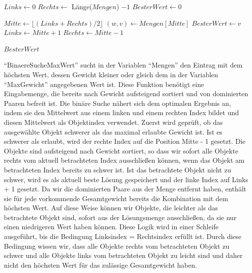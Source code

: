 \begin{algorithmic}
    \State \vspace{0.5em}
    
    \State $Links \leftarrow 0$
    \State $Rechts \leftarrow$ Länge($Mengen$) $- 1$
    \State $BesterWert \leftarrow 0$

        \State $Mitte \leftarrow \lfloor(Links + Rechts) / 2\rfloor$
        \State $(w, v) \leftarrow Mengen[Mitte]$
            \State $BesterWert \leftarrow v$
            \State $Links \leftarrow Mitte + 1$
        \Else
            \State $Rechts \leftarrow Mitte - 1$
        \EndIf
    \EndWhile

    \State \Return $BesterWert$
    \EndFunction
\end{algorithmic}

\enquote{BinaereSucheMaxWert} sucht in der Variablen \enquote{Mengen} den Eintrag mit dem höchsten Wert, dessen Gewicht kleiner oder gleich dem in der Variablen \enquote{MaxGewicht} angegebenen Wert ist. Diese Funktion benötigt eine Eingabemenge, die bereits nach Gewicht aufsteigend sortiert und von dominierten Paaren befreit ist. Die binäre Suche nähert sich dem optimalen Ergebnis an, indem sie den Mittelwert aus einem linken und einem rechten Index bildet und diesen Mittelwert als Objektindex verwendet. Zuerst wird geprüft, ob das ausgewählte Objekt schwerer als das maximal erlaubte Gewicht ist. Ist es schwerer als erlaubt, wird der rechte Index auf die Position Mitte - 1 gesetzt. Die Objekte sind aufsteigend nach Gewicht sortiert, so dass wir sofort alle Objekte rechts vom aktuell betrachteten Index ausschließen können, wenn das Objekt am betrachteten Index bereits zu schwer ist. Ist das betrachtete Objekt nicht zu schwer, wird es als aktuell beste Lösung gespeichert und der linke Index auf Links + 1 gesetzt. Da wir die dominierten Paare aus der Menge entfernt haben, enthält sie für jede vorkommende Gesamtgewicht bereits die Kombination mit dem höchsten Wert. Auf diese Weise können wir Objekte, die leichter als das betrachtete Objekt sind, sofort aus der Lösungsmenge ausschließen, da sie nur einen niedrigeren Wert haben können. Diese Logik wird in einer Schleife ausgeführt, bis die Bedingung Linksindex = Rechtsindex erfüllt ist. Durch diese Bedingung wissen wir, dass alle Objekte rechts vom betrachteten Objekt zu schwer und alle Objekte links vom betrachteten Objekt zu leicht sind und daher nicht den höchsten Wert für das zulässige Gesamtgewicht haben.

